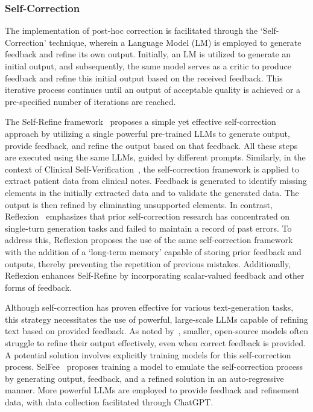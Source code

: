 \documentclass[12pt]{extarticle}
\begin{document}
\subsubsection{Self-Correction}
The implementation of post-hoc correction is facilitated through the `Self-Correction' technique, wherein a Language Model (LM) is employed to generate feedback and refine its own output. Initially, an LM is utilized to generate an initial output, and subsequently, the same model serves as a critic to produce feedback and refine this initial output based on the received feedback. This iterative process continues until an output of acceptable quality is achieved or a pre-specified number of iterations are reached.

The Self-Refine framework~\cite{madaan2023selfrefine} proposes a simple yet effective self-correction approach by utilizing a single powerful pre-trained LLMs to generate output, provide feedback, and refine the output based on that feedback. All these steps are executed using the same LLMs, guided by different prompts. Similarly, in the context of Clinical Self-Verification~\cite{gero2023selfverification}, the self-correction framework is applied to extract patient data from clinical notes. Feedback is generated to identify missing elements in the initially extracted data and to validate the generated data. The output is then refined by eliminating unsupported elements. In contrast, Reflexion~\cite{shinn2023reflexion} emphasizes that prior self-correction research has concentrated on single-turn generation tasks and failed to maintain a record of past errors. To address this, Reflexion proposes the use of the same self-correction framework with the addition of a `long-term memory' capable of storing prior feedback and outputs, thereby preventing the repetition of previous mistakes. Additionally, Reflexion enhances Self-Refine by incorporating scalar-valued feedback and other forms of feedback.

Although self-correction has proven effective for various text-generation tasks, this strategy necessitates the use of powerful, large-scale LLMs capable of refining text based on provided feedback. As noted by~\cite{madaan2023selfrefine}, smaller, open-source models often struggle to refine their output effectively, even when correct feedback is provided. A potential solution involves explicitly training models for this self-correction process. SelFee~\cite{selfee2023} proposes training a model to emulate the self-correction process by generating output, feedback, and a refined solution in an auto-regressive manner. More powerful LLMs are employed to provide feedback and refinement data, with data collection facilitated through ChatGPT.
\end{document}
